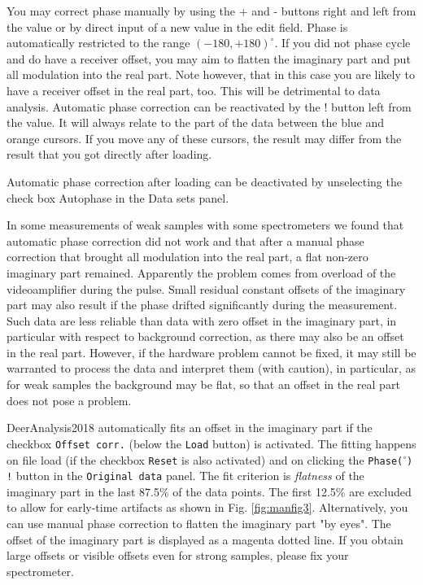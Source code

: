 \documentclass{article}
\begin{document}
You may correct phase manually by using the {\ttfamily +} and {\ttfamily -} buttons right and left from the value or by direct input of a new value in the edit field. Phase is automatically restricted to the range $(-180,+180)^\circ$. If you did not phase cycle
and do have a receiver offset, you may aim to flatten the imaginary part and
put all modulation into the real part. Note however, that in this case you are
likely to have a receiver offset in the real part, too. This will be detrimental to
data analysis. Automatic phase correction can be reactivated by the {\ttfamily !} button left from the value. It will always relate to the part of the data between the blue and orange cursors. If you move any of these cursors, the result may differ from the result that you got directly after loading.

Automatic phase correction after loading can be deactivated by unselecting
the check box {\ttfamily Autophase} in the {\ttfamily Data sets} panel.

In some measurements of weak samples with some spectrometers we found that automatic phase correction did not work and that after a manual phase correction that brought all modulation into the real part, a flat non-zero imaginary part remained. Apparently the problem comes from overload of the videoamplifier during the pulse. Small residual constant offsets of the imaginary part may also result if the phase drifted significantly during the measurement. Such data are less reliable than data with zero offset in the imaginary part, in particular with respect to background correction, as there may also be an offset in the real part. However, if the hardware problem cannot be fixed, it may still be warranted to process the data and interpret them (with caution), in particular, as for weak samples the background may be flat, so that an offset in the real part does not pose a problem.

DeerAnalysis2018 automatically fits an offset in the imaginary part if the checkbox \texttt{Offset corr.} (below the \texttt{Load} button) is activated. The fitting happens on file load (if the checkbox \texttt{Reset} is also activated) and on clicking the \texttt{Phase($^{\circ}$) !} button in the \texttt{Original data} panel. The fit criterion is \emph{flatness} of the imaginary part in the last 87.5\% of the data points. The first 12.5\% are excluded to allow for early-time artifacts as shown in Fig. \ref{fig:manfig3}. Alternatively, you can use manual phase correction to flatten the imaginary part "by eyes". The offset of the imaginary part is displayed as a magenta dotted line. If you obtain large offsets or visible offsets even for strong samples, please fix your spectrometer.
\end{document}
